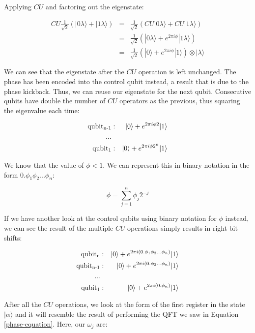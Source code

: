 \documentclass[msc,oneside]{ubcthesis}
\begin{document}
	Applying $CU$ and factoring out the eigenstate:
	
	\begin{eqnarray*}
		CU \frac{1}{\sqrt{2}}(|0 \lambda \rangle + |1 \lambda\rangle) &=&  \frac{1}{\sqrt{2}}(CU|0 \lambda \rangle + CU|1 \lambda\rangle )\\
		&=& \frac{1}{\sqrt{2}}(|0 \lambda \rangle + e^{2\pi i \phi}|1 \lambda\rangle)\\
		&=&\frac{1}{\sqrt{2}}( |0 \rangle + e^{2\pi i \phi}|1 \rangle)\otimes |\lambda\rangle
	\end{eqnarray*}
	
	We can see that the eigenstate after the $CU$ operation is left unchanged. The phase has been encoded into the control qubit instead, a result that is due to the phase kickback. Thus, we can reuse our eigenstate for the next qubit. Consecutive qubits have double the number of $CU$ operators as the previous, thus squaring the eigenvalue each time:
	
	\begin{eqnarray*}
		\text{qubit\textsubscript{n-1}} &:&   |0 \rangle + e^{2\pi i \phi 2}|1 \rangle \\
		...\\
		\text{qubit\textsubscript{1}} &:&   |0 \rangle + e^{2\pi i \phi 2^n}|1 \rangle
	\end{eqnarray*}
	
	We know that the value of $\phi < 1$. We can represent this in binary notation in the form $0.\phi_1\phi_2...\phi_n$:
	
	$$\phi = \sum_{j=1}^n \phi_j 2^{-j}$$
	
	If we have another look at the control qubits using binary notation for $\phi$ instead, we can see the result of the multiple $CU$ operations simply results in right bit shifts:
	
	
	\begin{eqnarray*}
		\text{qubit\textsubscript{n}} &:&   |0 \rangle +e^{2\pi i (0.\phi_1\phi_2...\phi_n)}|1 \rangle  \\
		\text{qubit\textsubscript{n-1}} &:&   |0 \rangle + e^{2\pi i (0.\phi_2...\phi_n)}|1 \rangle \\
		...\\
		\text{qubit\textsubscript{1}} &:&   |0 \rangle + e^{2\pi i (0.\phi_n)}|1 \rangle
	\end{eqnarray*}
	
	 After all the $CU$ operations, we look at the form of the first register in the state $|\alpha\rangle$ and it will resemble the result of performing the QFT we saw in Equation \eqref{phase-equation}. Here, our $\omega_j$ are:
	
\end{document}
